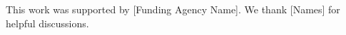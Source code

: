 \documentclass{article}
\begin{document}


\begin{ack}


This work was supported by [Funding Agency Name]. We thank [Names] for helpful discussions.
\end{ack}


\appendix

\appendix

\end{document}
